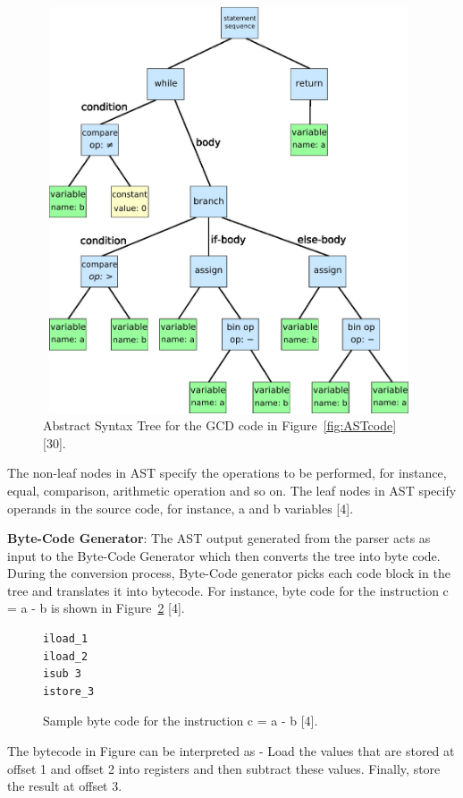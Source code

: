 \begin{figure}
  \centering
      \includegraphics[width=11cm, height=12cm]{AST.jpg}
    \caption[Abstract Syntax Tree]{Abstract Syntax Tree for the GCD code in Figure~\ref{fig:ASTcode} [30].}
    \label{fig:AST}
\end{figure}
The non-leaf nodes in AST specify the operations to be performed, for instance, equal, comparison, arithmetic operation and so on. The leaf nodes in AST specify operands in the source code, for instance, a and b variables [4]. 

\textbf{Byte-Code Generator}: The AST output generated from the parser acts as input to the Byte-Code Generator which then converts the tree into byte code. During the conversion process, Byte-Code generator picks each code block in the tree and translates it into bytecode. For instance, byte code for the instruction c = a - b is shown in Figure~\ref{fig:samplebytecode} [4].

\begin{figure}
  \centering
\begin{lstlisting} 
iload_1
iload_2
isub 3
istore_3
\end{lstlisting}
    \caption[Sample byte code]{Sample byte code for the instruction c = a - b [4].}
    \label{fig:samplebytecode}
\end{figure}

The bytecode in Figure can be interpreted as - Load the values that are stored at offset 1 and offset 2 into registers and then subtract these values. Finally, store the result at offset 3.